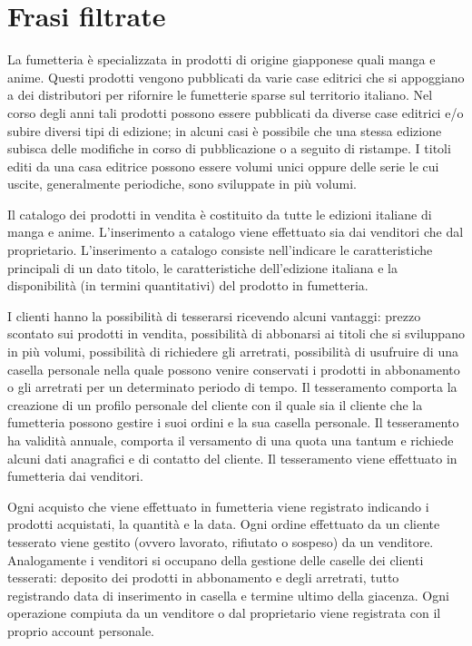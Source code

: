 \documentclass[a4paper]{scrartcl}
\begin{document}
\section*{Frasi filtrate}
La fumetteria è specializzata in prodotti di origine giapponese quali manga e anime. Questi prodotti vengono pubblicati da varie case editrici che si appoggiano a dei distributori per rifornire le fumetterie sparse sul territorio italiano. Nel corso degli anni tali prodotti possono essere pubblicati da diverse case editrici e/o subire diversi tipi di edizione; in alcuni casi è possibile che una stessa edizione subisca delle modifiche in corso di pubblicazione o a seguito di ristampe. I titoli editi da una casa editrice possono essere volumi unici oppure delle serie le cui uscite, generalmente periodiche, sono sviluppate in più volumi.

Il catalogo dei prodotti in vendita è costituito da tutte le edizioni italiane di manga e anime. L'inserimento a catalogo viene effettuato sia dai venditori che dal proprietario.   L'inserimento a catalogo consiste nell'indicare le caratteristiche principali di un dato titolo, le caratteristiche dell'edizione italiana e la disponibilità (in termini quantitativi) del prodotto in fumetteria.

I clienti hanno la possibilità di tesserarsi ricevendo alcuni vantaggi: prezzo scontato sui prodotti in vendita, possibilità di abbonarsi ai titoli che si sviluppano in più volumi, possibilità di richiedere gli arretrati, possibilità di usufruire di una casella personale nella quale possono venire conservati i prodotti in abbonamento o gli arretrati per un determinato periodo di tempo. Il tesseramento comporta la creazione di un profilo personale del cliente con il quale sia il cliente che la fumetteria possono gestire i suoi ordini e la sua casella personale. Il tesseramento ha validità annuale, comporta il versamento di una quota una tantum e richiede alcuni dati anagrafici e di contatto del cliente. Il tesseramento viene effettuato in fumetteria dai venditori.

Ogni acquisto che viene effettuato in fumetteria viene registrato indicando i prodotti acquistati, la quantità e la data. Ogni ordine effettuato da un cliente tesserato viene gestito (ovvero lavorato, rifiutato o sospeso) da un venditore. Analogamente i venditori si occupano della gestione delle caselle dei clienti tesserati: deposito dei prodotti in abbonamento e degli arretrati, tutto registrando data di inserimento in casella e termine ultimo della giacenza. Ogni operazione compiuta da un venditore o dal proprietario viene registrata con il proprio account personale.
\end{document}
